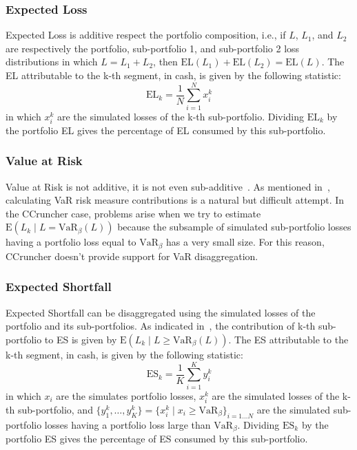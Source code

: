 \documentclass[11pt,fleqn]{book} %
\begin{document}
\subsubsection{Expected Loss}
Expected Loss is additive respect the portfolio composition, i.e., if 
$L$, $L_1$, and $L_2$ are respectively the portfolio, sub-portfolio 1, 
and sub-portfolio 2 loss distributions in which $L=L_1+L_2$, then 
$\text{EL}(L_1) + \text{EL}(L_2) = \text{EL}(L)$. The EL attributable
to the k-th segment, in cash, is given by the following statistic:
\begin{displaymath}
	\text{EL}_k = \frac{1}{N} \displaystyle \sum_{i=1}^{N} x_i^k
\end{displaymath}
in which $x_i^k$ are the simulated losses of the k-th sub-portfolio.
Dividing $\text{EL}_k$ by the portfolio EL gives the percentage of EL 
consumed by this sub-portfolio.

\subsubsection{Value at Risk}
Value at Risk is not additive, it is not even sub-additive~\cite{var:varbad}.
As mentioned in~\cite[chap. 5.2.2]{bluhm:2002}, calculating VaR risk 
measure contributions is a natural but difficult attempt. In the CCruncher 
case, problems arise when we try to estimate 
$\text{E}\left(L_k \mid L = \text{VaR}_{\beta}(L)\right)$ because the subsample
of simulated sub-portfolio losses having a portfolio loss equal to 
$\text{VaR}_{\beta}$ has a very small size. For this reason, CCruncher 
doesn't provide support for VaR disaggregation.

\subsubsection{Expected Shortfall}
Expected Shortfall can be disaggregated using the simulated losses of the 
portfolio and its sub-portfolios. As indicated 
in~\cite[chap. 5.2.3]{bluhm:2002}, the contribution of k-th sub-portfolio to 
ES is given by $\text{E}\left(L_k \mid L \ge \text{VaR}_{\beta}(L)\right)$.
The ES attributable to the k-th segment, in cash, is given by the 
following statistic:
\begin{displaymath}
	\text{ES}_k = \frac{1}{K} \displaystyle \sum_{i=1}^{K} y_i^k
\end{displaymath}
in which $x_i$ are the simulates portfolio losses, $x_i^k$ are the simulated 
losses of the k-th sub-portfolio, and
$\{y_1^k,\dots,y_K^k\} = \{x_i^k \mid x_i \ge \text{VaR}_{\beta}\}_{i=1\dots N}$ 
are the simulated sub-portfolio losses having a portfolio loss large than 
$\text{VaR}_{\beta}$.
Dividing $\text{ES}_k$ by the portfolio ES gives the percentage of ES 
consumed by this sub-portfolio.
\end{document}

